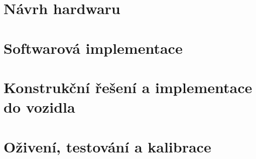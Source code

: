 \chapter{Návrh hardwaru}

\chapter{Softwarová implementace}

\chapter{Konstrukční řešení a implementace do vozidla}

\chapter{Oživení, testování a kalibrace}











